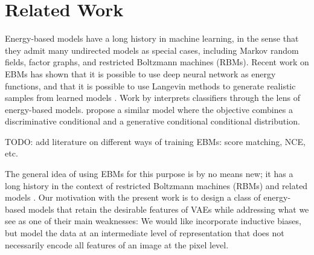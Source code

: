\documentclass{article}
\begin{document}
\section{Related Work}
\label{sec:related-work}
\vspace*{-1.5ex}



Energy-based models \cite{lecun2006tutorial} have a long history in machine learning, in the sense that they admit many undirected models as special cases, including Markov random fields, factor graphs, and restricted Boltzmann machines (RBMs). Recent work on EBMs has shown that it is possible to use deep neural network as energy functions, and that it is possible to use Langevin methods to generate realistic samples from learned models \cite{du2019implicit,xie2016theory}. Work by \citet{grathwohl2019your} interprets classifiers through the lens of energy-based models. \citet{liu2020hybrid} propose a similar model where the objective combines a discriminative conditional and a generative conditional conditional distribution. %

TODO: add literature on different ways of training EBMs: score matching, NCE, etc.  

The general idea of using EBMs for this purpose is by no means new; it has a long history in the context of restricted Boltzmann machines (RBMs) and related models \citep{smolensky1986information, welling2005exponential, hinton2006fast}. Our motivation with the present work is to design a class of energy-based models that retain the desirable features of VAEs while addressing what we see as one of their main weaknesses: We would like incorporate inductive biases, but model the data at an intermediate level of representation that does not necessarily encode all features of an image at the pixel level. 
\end{document}
